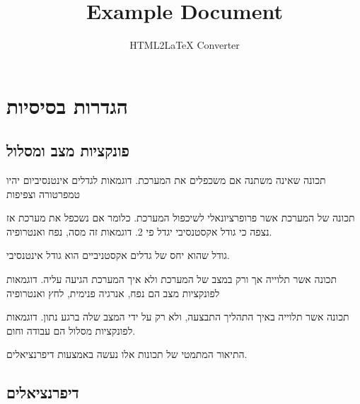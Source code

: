 \documentclass{tstextbook}
\begin{document}
\title{Example Document}
\author{HTML2LaTeX Converter}
\maketitle

\section{הגדרות בסיסיות}

\subsection{פונקציות מצב ומסלול}

\begin{definition}
תכונה שאינה משתנה אם משכפלים את המערכת. דוגמאות לגדלים אינטנסיביום יהיו טמפרטורה וצפיפות

\end{definition}
\begin{definition}
תכונה של המערכת אשר פרופרציונאלי לשיכפול המערכת. כלומר אם נשכפל את מערכת אז נצפה כי גודל אקסטנסיבי יגדל פי 2. דוגמאות זה מסה, נפח ואנטרופיה.

\end{definition}
\begin{proposition}
גודל שהוא יחס של גדלים אקסטניביים הוא גודל אינטנסיבי.

\end{proposition}
\begin{definition}
תכונה אשר תלוייה אך ורק במצב של המערכת ולא איך המערכת הגיעה עליה. דוגמאות לפונקציות מצב הם נפח, אנרגיה פנימית, לחץ ואנטרופיה

\end{definition}
\begin{definition}
תכונה אשר תלוייה באיך התהליך התבצעה, ולא רק על ידי המצב שלה ברגע נתון. דוגמאות לפונקציות מסלול הם עבודה וחום.

\end{definition}
התיאור המתמטי של תכונות אלו נעשה באמצעות דיפרנציאלים.

\subsection{דיפרנציאלים}
\end{document}
